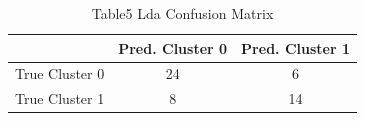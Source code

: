 
\begin{table}[htbp]
    \centering
    \small
    \caption{Table5 Lda Confusion Matrix}
    \label{tab:table5_lda_confusion_matrix}
    \begin{tabular}{lcc}
        \toprule
         & Pred. Cluster 0 & Pred. Cluster 1 \\
        \midrule
        True Cluster 0 & 24 & 6 \\
        True Cluster 1 & 8 & 14 \\
        \bottomrule
    \end{tabular}
\end{table}

